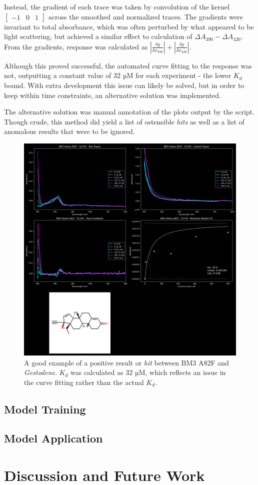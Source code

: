 \documentclass{article}
\begin{document}
Instead, the gradient of each trace was taken by convolution of the kernel $\begin{bmatrix} -1 & 0 & 1 \end{bmatrix}$ across the smoothed and normalized traces.
The gradients were invariant to total absorbance, which was often perturbed by what appeared to be light scattering, but achieved a similar effect to calculation of $\Delta A_{390} - \Delta A_{420}$.
From the gradients, response was calculated as $|{\frac{\delta y}{\delta x_{390}}}| + |{\frac{\delta y}{\delta x_{420}}}|$.

Although this proved successful, the automated curve fitting to the response was not, outputting a constant value of 32 µM for each experiment - the lower $K_d$ bound.
With extra development this issue can likely be solved, but in order to keep within time constraints, an alternative solution was implemented.

The alternative solution was manual annotation of the plots output by the script.
Though crude, this method did yield a list of ostensible \textit{hits} as well as a list of anomalous results that were to be ignored.

\begin{figure}\label{screeninghit}
	\caption{A good example of a positive result or \textit{hit} between BM3 A82F and \textit{Gestodene}. $K_d$ was calculated as 32 µM, which reflects an issue in the curve fitting rather than the actual $K_d$.}
	\includegraphics[width = \textwidth]{img/BM3-Heme-A82F:S1376.png}
\end{figure}

\subsection{Model Training}
\subsection{Model Application}
\section{Discussion and Future Work}

\printbibliography
\end{document}
